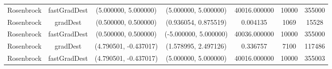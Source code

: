 \begin{longtable}{|c|c|c|c|c|c|c|}
Rosenbrock & fastGradDest & (5.000000, 5.000000) & (5.000000, 5.000000) & 40016.000000 & 10000 & 355000 \\
Rosenbrock & gradDest & (0.500000, 0.500000) & (0.936054, 0.875519) & 0.004135 & 1069 & 15528 \\
Rosenbrock & fastGradDest & (0.500000, 0.500000) & (-5.000000, 5.000000) & 40036.000000 & 10000 & 355000 \\
Rosenbrock & gradDest & (4.790501, -0.437017) & (1.578995, 2.497126) & 0.336757 & 7100 & 117486 \\
Rosenbrock & fastGradDest & (4.790501, -0.437017) & (5.000000, 5.000000) & 40016.000000 & 10000 & 355003 \\
\hline
\end{longtable}
